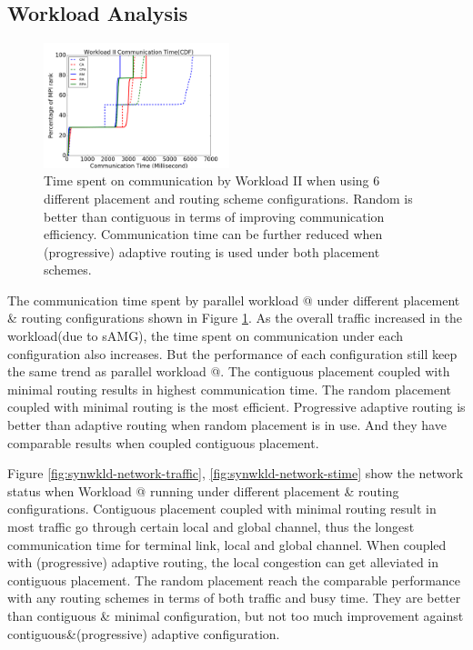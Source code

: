 \documentclass[conference,compsoc]{IEEEtran}
\makeatletter
\newcommand{\Rmnum}[1]{\expandafter\@slowromancap\romannumeral #1@}
\makeatother
\begin{document}
\subsection{Workload Analysis}

\begin{figure}[h!]
  \centering
  \includegraphics[width = 0.48\textwidth ]{syn-wkld/wkld-commtime}
  \caption{ Time spent on communication by Workload II when using 6 different placement and routing scheme configurations. Random is better than contiguous in terms of improving communication efficiency. Communication time can be further reduced when (progressive) adaptive routing is used under both placement schemes. }
  \label{fig:syn-wkld-commtime}
\end{figure}

The communication time spent by parallel workload \Rmnum{2} under different placement \& routing configurations shown in Figure \ref{fig:syn-wkld-commtime}. As the overall traffic increased in the workload(due to sAMG), the time spent on communication under each configuration also increases. But the performance of each configuration still keep the same trend as parallel workload \Rmnum{1}. The contiguous placement coupled with minimal routing results in highest communication time. The random placement coupled with minimal routing is the most efficient. Progressive adaptive routing is better than adaptive routing when random placement is in use. And they have comparable results when coupled contiguous placement. 


Figure \ref{fig:synwkld-network-traffic}, \ref{fig:synwkld-network-stime} show the network status when Workload \Rmnum{2} running under different placement \& routing configurations. Contiguous placement coupled with minimal routing result in most traffic go through certain local and global channel, thus the longest  communication time for terminal link, local and global channel. When coupled with (progressive) adaptive routing, the local congestion can get alleviated in contiguous placement. The random placement reach the comparable performance with any routing schemes in terms of both traffic and busy time. They are better than contiguous \& minimal configuration, but not too much improvement against contiguous\&(progressive) adaptive configuration.
\end{document}
